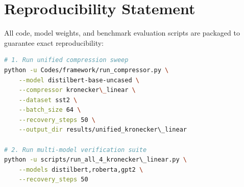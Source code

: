 \section{Reproducibility Statement}
All code, model weights, and benchmark evaluation scripts are packaged to guarantee exact reproducibility:
\begin{lstlisting}[language=bash]
# 1. Run unified compression sweep
python -u Codes/framework/run_compressor.py \
    --model distilbert-base-uncased \
    --compressor kronecker\_linear \
    --dataset sst2 \
    --batch_size 64 \
    --recovery_steps 50 \
    --output_dir results/unified_kronecker\_linear

# 2. Run multi-model verification suite
python -u scripts/run_all_4_kronecker\_linear.py \
    --models distilbert,roberta,gpt2 \
    --recovery_steps 50
\end{lstlisting}
